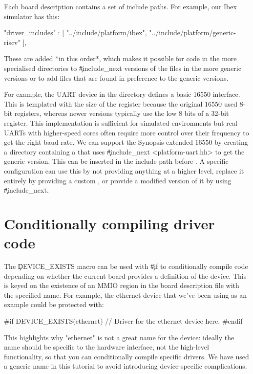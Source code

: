 Each board description contains a set of include paths.
For example, our Ibex simulator has this:

\begin{jsonsnippet}
    "driver_includes" : [
        "../include/platform/ibex",
        "../include/platform/generic-riscv"
    ],
\end{jsonsnippet}

These are added *in this order*, which makes it possible for code in the more specialised directories to \c{#include_next} versions of the files in the more generic versions or to add files that are found in preference to the generic versions.

For example, the UART device in the  directory defines a basic 16550 interface.
This is templated with the size of the register because the original 16550 used 8-bit registers, whereas newer versions typically use the low 8 bits of a 32-bit register.
This implementation is sufficient for simulated environments but real UARTs with higher-speed cores often require more control over their frequency to get the right baud rate.
We can support the Synopsis extended 16550 by creating a  directory containing a  that uses \c{#include_next <platform-uart.hh>} to get the generic version.
This can be inserted in the include path before .
A specific configuration can use this by not providing anything at a higher level, replace it entirely by providing a custom , or provide a modified version of it by using \c{#include_next}.

\section{Conditionally compiling driver code}

The \c{DEVICE_EXISTS} macro can be used with \c{#if} to conditionally compile code depending on whether the current board provides a definition of the device.
This is keyed on the existence of an MMIO region in the board description file with the specified name.
For example, the ethernet device that we've been using as an example could be protected with:

\begin{cxxsnippet}
#if DEVICE_EXISTS(ethernet)
// Driver for the ethernet device here.
#endif
\end{cxxsnippet}

\begin{note}
This highlights why "ethernet" is not a great name for the device: ideally the name should be specific to the hardware interface, not the high-level functionality, so that you can conditionally compile specific drivers.
We have used a generic name in this tutorial to avoid introducing device-specific complications.
\end{note}
